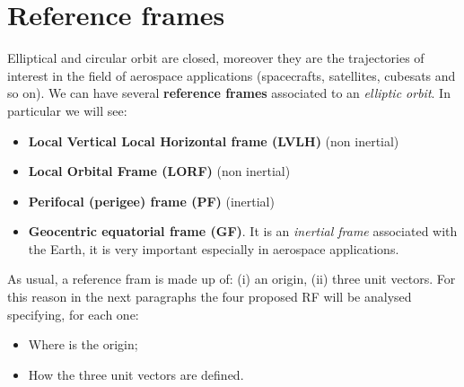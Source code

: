 \section{Reference frames}
Elliptical and circular orbit are closed, moreover they are the trajectories of interest in the field of aerospace applications (spacecrafts, satellites, cubesats and so on). We can have several \textbf{reference frames} associated to an \textit{elliptic orbit}. In particular we will see:
\begin{itemize}
    \itemsep0em
    \item[\ding{202}] \textsf{\textbf{Local Vertical Local Horizontal frame (LVLH)}} (non inertial)
    \item[\ding{203}] \textsf{\textbf{Local Orbital Frame (LORF)}} (non inertial)
    \item[\ding{204}] \textsf{\color{red}\textbf{Perifocal (perigee) frame (PF)}} (inertial)
    \item[\ding{205}] \textsf{\color{red}\textbf{Geocentric equatorial frame (GF)}}. It is an \textit{inertial frame} associated with the Earth, it is very important especially in aerospace applications. 
\end{itemize}
As usual, a reference fram is made up of: (i) an origin, (ii) three unit vectors. For this reason in the next paragraphs the four proposed RF will be analysed specifying, for each one:
\begin{itemize}
    \itemsep0em
    \item Where is the origin;
    \item How the three unit vectors are defined.
\end{itemize}

